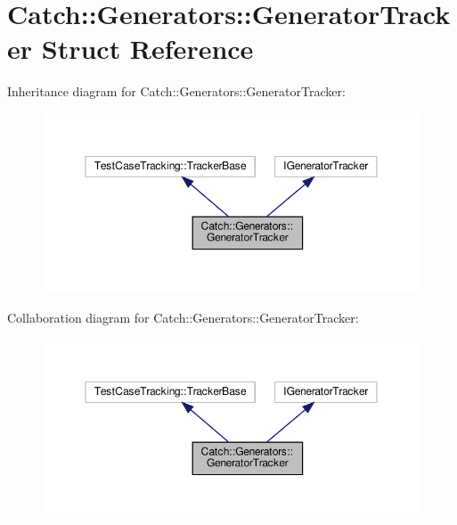 \hypertarget{structCatch_1_1Generators_1_1GeneratorTracker}{}\section{Catch\+:\+:Generators\+:\+:Generator\+Tracker Struct Reference}
\label{structCatch_1_1Generators_1_1GeneratorTracker}


Inheritance diagram for Catch\+:\+:Generators\+:\+:Generator\+Tracker\+:
\nopagebreak
\begin{figure}[H]
\begin{center}
\leavevmode
\includegraphics[width=350pt]{structCatch_1_1Generators_1_1GeneratorTracker__inherit__graph}
\end{center}
\end{figure}


Collaboration diagram for Catch\+:\+:Generators\+:\+:Generator\+Tracker\+:
\nopagebreak
\begin{figure}[H]
\begin{center}
\leavevmode
\includegraphics[width=350pt]{structCatch_1_1Generators_1_1GeneratorTracker__coll__graph}
\end{center}
\end{figure}
